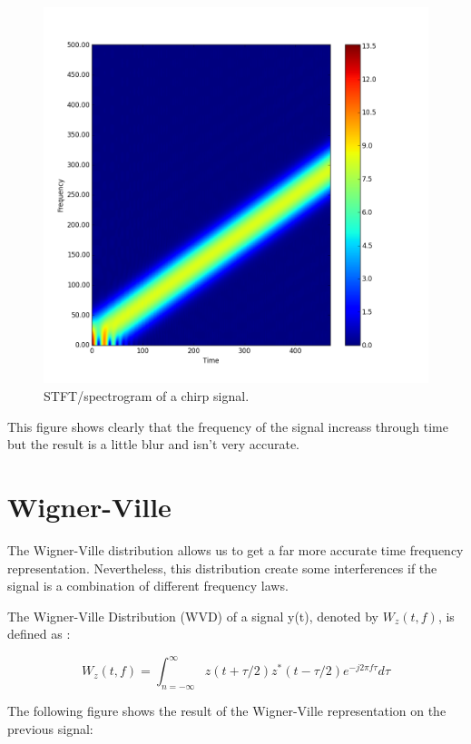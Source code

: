 \begin{figure}[H]
\centering
    \includegraphics[scale=0.6,angle=0]{Images/Chirp_STFT.png}
    \caption{STFT/spectrogram of a chirp signal.}
    \label{fig:Chirp_STFT}
\end{figure}

This figure shows clearly that the frequency of the signal increass through time but the result is a little blur and isn't very accurate.

\chapter{Wigner-Ville}

The Wigner-Ville distribution allows us to get a far more accurate time frequency representation. Nevertheless, this distribution create some interferences if the signal is a combination of different frequency laws.

The Wigner-Ville Distribution (WVD) of a signal y(t), denoted by $W_z(t,f)$, is defined as :

\begin{equation}
W_z(t,f) = \int_{n=-\infty}^{\infty} z ( t + \tau / 2 ) z^* (t - \tau / 2) e^{-j 2 \pi f \tau} d \tau
\end{equation}

The following figure shows the result of the Wigner-Ville representation on the previous signal:

